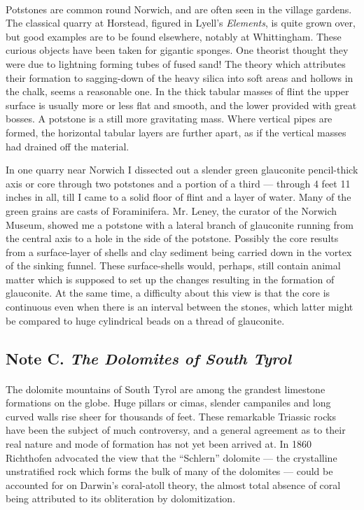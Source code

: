 \documentclass[a4paper, 12pt, oneside]{article}
\begin{document}
\paragraph{}
Potstones are common round Norwich, and are often seen in the village gardens. The classical quarry at Horstead, figured in Lyell's \emph{Elements}, is quite grown over, but good examples are to be found elsewhere, notably at Whittingham. These curious objects have been taken for gigantic sponges. One theorist thought they were due to lightning forming tubes of fused sand! The theory which attributes their formation to sagging-down of the heavy silica into soft areas and hollows in the chalk, seems a reasonable one. In the thick tabular masses of flint the upper surface is usually more or less flat and smooth, and the lower provided with great bosses. A potstone is a still more gravitating mass. Where vertical pipes are formed, the horizontal tabular layers are further apart, as if the vertical masses had drained off the material.

In one quarry near Norwich I dissected out a slender green glauconite pencil-thick axis or core through two potstones and a portion of a third --- through 4 feet 11 inches in all, till I came to a solid floor of flint and a layer of water. Many of the green grains are casts of Foraminifera. Mr. Leney, the curator of the Norwich Museum, showed me a potstone with a lateral branch of glauconite running from the central axis to a hole in the side of the potstone. Possibly the core results from a surface-layer of shells and clay sediment being carried down in the vortex of the sinking funnel. These surface-shells would, perhaps, still contain animal matter which is supposed to set up the changes resulting in the formation of glauconite. At the same time, a difficulty about this view is that the core is continuous even when there is an interval between the stones, which latter might be compared to huge cylindrical beads on a thread of glauconite.

\subsection{Note C. \emph{The Dolomites of South Tyrol}}
\paragraph{}
The dolomite mountains of South Tyrol are among the grandest limestone formations on the globe. Huge pillars or cimas, slender campaniles and long curved walls rise sheer for thousands of feet. These remarkable Triassic rocks have been the subject of much controversy, and a general agreement as to their real nature and mode of formation has not yet been arrived at. In 1860 Richthofen advocated the view that the ``Schlern'' dolomite --- the crystalline unstratified rock which forms the bulk of many of the dolomites --- could be accounted for on Darwin's coral-atoll theory, the almost total absence of coral being attributed to its obliteration by dolomitization.
\end{document}
